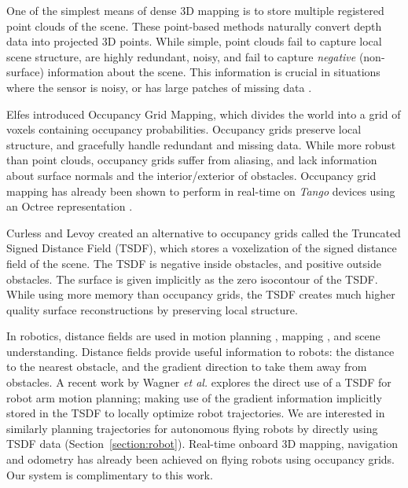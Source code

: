 \documentclass[conference]{IEEEtran}
\newcommand{\sref}[1]{Section~\ref{#1}}
\newcommand{\etal}{\textit{et al.}\xspace}
\newcommand{\Tango}{\textit{Tango}\xspace}
\newcommand{\TSDF}{TSDF\xspace}
\begin{document}
One of the simplest means of dense 3D mapping is to  store multiple registered
point clouds of the scene. These point-based methods \cite{RusinkiewiczPoints,
TanskanenMetric, WeiseScanning, LSDSlam} naturally convert depth data into
projected 3D points. While simple, point clouds fail to capture local scene structure, are
highly redundant, noisy, and fail to capture \emph{negative} (non-surface)
information about the scene. This information is crucial in situations where the sensor is noisy,
or has large patches of missing data \cite{Klingensmith2014}.

Elfes \cite{Elfes1989} introduced Occupancy Grid Mapping, which divides the
world into a grid of voxels containing occupancy probabilities. Occupancy grids
preserve local structure, and gracefully handle redundant and missing data.  
While more robust than point clouds, occupancy grids suffer from aliasing, and
lack information about surface normals and the interior/exterior of obstacles. 
Occupancy grid mapping has already been shown to perform in real-time on \Tango
\cite{Tango} devices using an Octree representation \cite{Wurm2010}.


Curless and Levoy \cite{Curless1996} created an alternative to occupancy
grids called the Truncated Signed Distance Field (\TSDF), which stores a
voxelization of the signed distance field of the scene. The \TSDF is negative
inside obstacles, and positive outside obstacles. The surface is given
implicitly as the zero isocontour of the \TSDF. While using more memory
than occupancy grids, the \TSDF creates much higher quality surface
reconstructions by preserving local structure.

In robotics, distance fields are used in motion planning
\cite{RatliffChomp}, mapping \cite{VandapelKA05}, and scene understanding.
Distance fields provide useful information to robots: the distance to the
nearest obstacle, and the gradient direction to take them away from obstacles. 
A recent work by Wagner \etal \cite{WagnerICRA13} explores the direct use of a
\TSDF for robot arm motion planning; making use of the gradient information
implicitly stored in the \TSDF to locally optimize robot trajectories. We are
interested in similarly planning trajectories for autonomous flying robots by
directly using \TSDF data (\sref{section:robot}). Real-time onboard 3D mapping,
navigation and odometry has already been achieved on flying robots
\cite{FlyingNavigation, OSMAV}using occupancy grids. Our system is complimentary to this
work.
\end{document}
